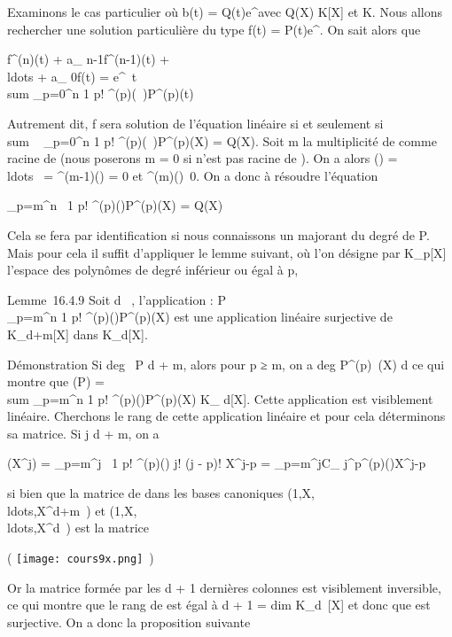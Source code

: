 \documentclass[]{article}
\begin{document}
Examinons le cas particulier où b(t) = Q(t)e^\mut avec Q(X) \in
K[X] et \mu \in K. Nous allons rechercher une solution particulière du
type f(t) = P(t)e^\mut. On sait alors que

f^(n)(t) + a_ n-1f^(n-1)(t) +
\\ldots + a_
0f(t) = e^\lambda~t \\sum
_p=0^n 1 \over p!
\chi^(p)(\lambda~)P^(p)(t)

Autrement dit, f sera solution de l'équation linéaire si et seulement
si~\\sum ~
_p=0^n 1 \over p!
\chi^(p)(\lambda~)P^(p)(X) = Q(X). Soit m la multiplicité de
\mu comme racine de \chi (nous poserons m = 0 si \mu n'est pas racine de \chi). On
a alors \chi(\mu) =
\\ldots~ =
\chi^(m-1)(\mu) = 0 et
\chi^(m)(\mu)\neq~0. On a donc à résoudre
l'équation

\sum _p=m^n~ 1
\over p! \chi^(p)(\mu)P^(p)(X) = Q(X)

Cela se fera par identification si nous connaissons un majorant du degré
de P. Mais pour cela il suffit d'appliquer le lemme suivant, où l'on
désigne par K_p[X] l'espace des polynômes de degré
inférieur ou égal à p,

Lemme~16.4.9 Soit d \in {}~, l'application \theta :
P\mapsto~\\\sum
 _p=m^n 1 \over p!
\chi^(p)(\mu)P^(p)(X) est une application linéaire
surjective de K_d+m[X] dans K_d[X].

Démonstration Si deg~ P \leq d + m, alors pour p ≥
m, on a deg P^(p)~(X) \leq d ce qui
montre que \theta(P) =\ \\sum
 _p=m^n 1 \over p!
\chi^(p)(\mu)P^(p)(X) \in K_ d[X]. Cette
application est visiblement linéaire. Cherchons le rang de cette
application linéaire et pour cela déterminons sa matrice. Si j \leq d + m,
on a

\theta(X^j) = \sum _p=m^j~
1 \over p! \chi^(p)(\mu) j!
\over (j - p)! X^j-p =
\sum _p=m^jC_
j^p\chi^(p)(\mu)X^j-p

si bien que la matrice de \theta dans les bases canoniques
(1,X,\\ldots,X^d+m~)
et
(1,X,\\ldots,X^d~)
est la matrice

\left ( \texttt{[image: cours9x.png]}
\,\right )

Or la matrice formée par les d + 1 dernières colonnes est visiblement
inversible, ce qui montre que le rang de \theta est égal à d + 1
= dim K_d~[X] et donc que \theta est
surjective. On a donc la proposition suivante
\end{document}
